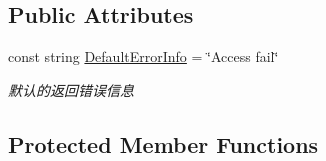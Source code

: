 \subsection*{Public Attributes}
\begin{DoxyCompactItemize}
\item 
const string \mbox{\hyperlink{class_t_net_1_1_service_1_1_game_struct_a41fbd26ea4219a9dc73186da833dec21}{Default\+Error\+Info}} = \char`\"{}Access fail\char`\"{}
\begin{DoxyCompactList}\small\item\em 默认的返回错误信息 \end{DoxyCompactList}\end{DoxyCompactItemize}
\subsection*{Protected Member Functions}
